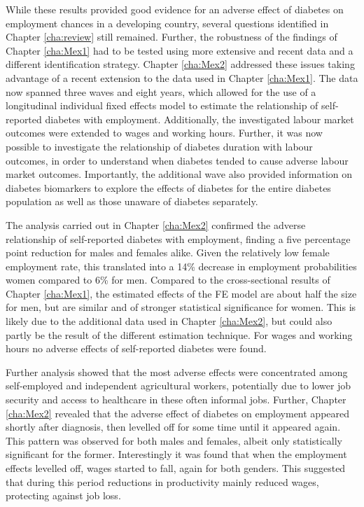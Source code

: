 While these results provided good evidence for an adverse effect of diabetes on employment chances in a developing country, several questions identified in Chapter \ref{cha:review} still remained. Further, the robustness of the findings of Chapter \ref{cha:Mex1} had to be tested using more extensive and recent data and a different identification strategy. Chapter \ref{cha:Mex2} addressed these issues taking advantage of a recent extension to the data used in Chapter \ref{cha:Mex1}. The data now spanned three waves and eight years, which allowed for the use of a longitudinal individual fixed effects model to estimate the relationship of self-reported diabetes with employment. Additionally, the investigated labour market outcomes were extended to wages and working hours. Further, it was now possible to investigate the relationship of diabetes duration with labour outcomes, in order to understand when diabetes tended to cause adverse labour market outcomes. Importantly, the additional wave also provided information on diabetes biomarkers to explore the effects of diabetes for the entire diabetes population as well as those unaware of diabetes separately.

The analysis carried out in Chapter \ref{cha:Mex2} confirmed the adverse relationship of self-reported diabetes with employment, finding a five percentage point reduction for males and females alike. Given the relatively low female employment rate, this translated into a 14\% decrease in employment probabilities women compared to 6\% for men. Compared to the cross-sectional results of Chapter \ref{cha:Mex1}, the estimated effects of the \ac{FE} model are about half the size for men, but are similar and of stronger statistical significance for women. This is likely due to the additional data used in Chapter \ref{cha:Mex2}, but could also partly be the result of the different estimation technique. For wages and working hours no adverse effects of self-reported diabetes were found.

Further analysis showed that the most adverse effects were concentrated among self-employed and independent agricultural workers, potentially due to lower job security and access to healthcare in these often informal jobs. Further, Chapter \ref{cha:Mex2} revealed that the adverse effect of diabetes on employment appeared shortly after diagnosis, then levelled off for some time until it appeared again. This pattern was observed for both males and females, albeit only statistically significant for the former. Interestingly it was found that when the employment effects levelled off, wages started to fall, again for both genders. This suggested that during this period reductions in productivity mainly reduced wages, protecting against job loss.

